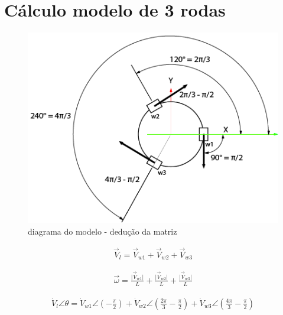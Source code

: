 \chapter{Cálculo modelo de 3 rodas}

\begin{figure}[h]
	\centering
	\includegraphics{figures/digram_model_dedution}
	\caption{diagrama do modelo - dedução da matriz}
	\label{lof}
\end{figure}

\begin{equation}
    \begin{split}
        \overrightarrow{V}_{l} = 
        \overrightarrow{V}_{w1}
        + \overrightarrow{V}_{w2}
        + \overrightarrow{V}_{w3}
    \end{split}
\end{equation}

\begin{equation}
    \begin{split}
        \overrightarrow{\omega} = 
        \frac{\vert\overrightarrow{V}_{w1}\vert}{L}
        + \frac{\vert\overrightarrow{V}_{w2}\vert}{L}
        + \frac{\vert\overrightarrow{V}_{w3}\vert}{L}
    \end{split}
\end{equation}


\begin{gather*}
        \dot{V}_{l} \angle \theta =  
        \dot{V}_{w1} \angle \left(-\frac{\pi}{2}\right) 
        + \dot{V}_{w2} \angle \left(\frac{2\pi}{3}-\frac{\pi}{2}\right) 
        + \dot{V}_{w3} \angle \left(\frac{4\pi}{3}-\frac{\pi}{2}\right) 
\end{gather*}

